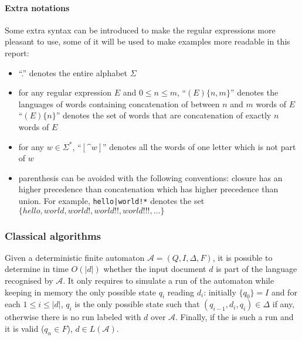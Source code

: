 \documentclass[12px]{article}
\begin{document}
        \paragraph{Extra notations}
          Some extra syntax can be introduced to make the
          regular expressions more pleasant to use, some of it will be used to
          make examples more readable in this report:
            \begin{itemize}
              \item ``.'' denotes the entire alphabet $\Sigma$
              \item for any regular expression $E$ and $0 \leq n \leq m$,
                ``$(E)\{n,m\}$'' denotes the languages of words containing
                concatenation of between $n$ and $m$ words of $E$
                ``$(E)\{n\}$'' denotes the set of words that are concatenation
                of exactly $n$ words of $E$
              \item for any $w \in \Sigma^*$,
                ``$[\texttt{\textasciicircum}w]$'' denotes all the words of one
                letter which is not part of $w$
              \item parenthesis can be avoided with the following conventions:
                closure has an higher precedence than concatenation which has
                higher precedence than union. For example,
                \texttt{hello|world!*} denotes the set $\{hello, world, world!,
                world!!, world!!!, \ldots\}$
            \end{itemize}

      \subsubsection{Classical algorithms}

        Given a deterministic finite automaton $\mathcal{A} = (Q, I, \Delta,
        F)$, it is possible to determine in time $O(|d|)$ whether the input
        document $d$ is part of the language recognised by $\mathcal{A}$. It
        only requires to simulate a run of the automaton while keeping in
        memory the only possible state $q_i$ reading $d_i$: initially $\{q_0\}
        = I$ and for each $1 \leq i \leq |d|$, $q_{i}$ is the only possible
        state such that $(q_{i-1}, d_i, q_i) \in \Delta$ if any, otherwise
        there is no run labeled with $d$ over $\mathcal{A}$. Finally, if the is
        such a run and it is valid ($q_n \in F$), $d \in L(\mathcal{A})$.
\end{document}
